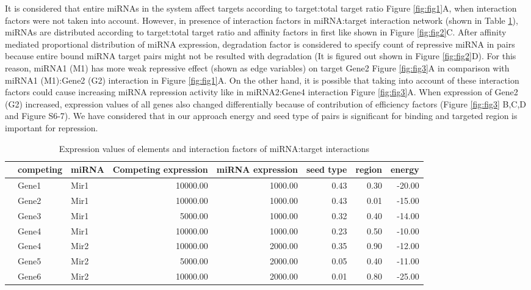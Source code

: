 \documentclass[a4,center,fleqn]{NAR}
\begin{document}
It is considered that entire miRNAs in the system affect targets
according to target:total target ratio Figure \ref{fig:fig1}A, when
interaction factors were not taken into account. However, in presence of
interaction factors in miRNA:target interaction network (shown in Table
\ref{tab:one}), miRNAs are distributed according to target:total target
ratio and affinity factors in first like shown in Figure
\ref{fig:fig2}C. After affinity mediated proportional distribution of
miRNA expression, degradation factor is considered to specify count of
repressive miRNA in pairs because entire bound miRNA target pairs might
not be resulted with degradation (It is figured out shown in Figure
\ref{fig:fig2}D). For this reason, miRNA1 (M1) has more weak repressive
effect (shown as edge variables) on target Gene2 Figure \ref{fig:fig3}A
in comparison with miRNA1 (M1):Gene2 (G2) interaction in Figure
\ref{fig:fig1}A. On the other hand, it is possible that taking into
account of these interaction factors could cause increasing miRNA
repression activity like in miRNA2:Gene4 interaction Figure
\ref{fig:fig3}A. When expression of Gene2 (G2) increased, expression
values of all genes also changed differentially because of contribution
of efficiency factors (Figure \ref{fig:fig3} B,C,D and Figure S6-7). We
have considered that in our approach energy and seed type of pairs is
significant for binding and targeted region is important for repression.

\begin{table}[ht]
\centering
\caption{Expression values of elements and interaction factors of miRNA:target interactions} 
\begin{tabular}{rllrrrrr}
  \hline
 & competing & miRNA & Competing expression & miRNA expression & seed type & region & energy \\ 
  \hline
   & Gene1 & Mir1 & 10000.00 & 1000.00 & 0.43 & 0.30 & -20.00 \\ 
   & Gene2 & Mir1 & 10000.00 & 1000.00 & 0.43 & 0.01 & -15.00 \\ 
   & Gene3 & Mir1 & 5000.00 & 1000.00 & 0.32 & 0.40 & -14.00 \\ 
   & Gene4 & Mir1 & 10000.00 & 1000.00 & 0.23 & 0.50 & -10.00 \\ 
   & Gene4 & Mir2 & 10000.00 & 2000.00 & 0.35 & 0.90 & -12.00 \\ 
   & Gene5 & Mir2 & 5000.00 & 2000.00 & 0.05 & 0.40 & -11.00 \\ 
   & Gene6 & Mir2 & 10000.00 & 2000.00 & 0.01 & 0.80 & -25.00 \\ 
   \hline
\end{tabular}
\label{tab:one}
\end{table}
\end{document}
